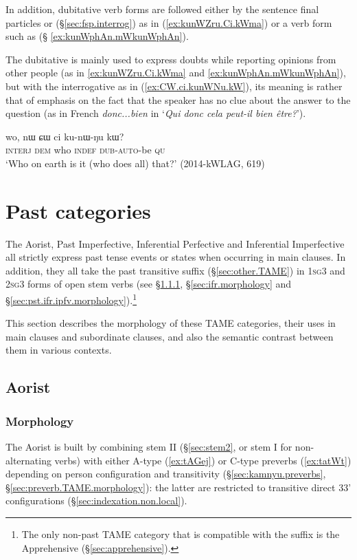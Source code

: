 In addition, dubitative verb forms are followed either by the sentence final particles  or  (§\ref{sec:fsp.interrog}) as in (\ref{ex:kunWZru.Ci.kWma}) or a verb form such as  (§ \ref{ex:kunWphAn.mWkunWphAn}).

The dubitative is mainly used to express doubts while reporting opinions from other people (as in \ref{ex:kunWZru.Ci.kWma} and \ref{ex:kunWphAn.mWkunWphAn}), but with the interrogative  as in (\ref{ex:CW.ci.kunWNu.kW}), its meaning is rather that of emphasis on the fact that the speaker has no clue about the answer to the question (as in French \textit{donc...bien} in `\textit{Qui donc cela peut-il bien être?}').

\begin{exe}
\ex \label{ex:CW.ci.kunWNu.kW}
 \gll wo, nɯ ɕɯ ci ku-nɯ-ŋu kɯ?  \\
 \textsc{interj} \textsc{dem} who \textsc{indef} \textsc{dub}-\textsc{auto}-be \textsc{qu} \\
\glt `Who on earth is it (who does all) that?' (2014-kWLAG, 619)
 \end{exe}
 
\section{Past categories}   \label{sec:TAME.pst}
The Aorist, Past Imperfective, Inferential Perfective and Inferential Imperfective all strictly express past tense events or states when occurring in main clauses. In addition, they all take the past transitive  suffix (§\ref{sec:other.TAME}) in \textsc{1sg}\fl{}3 and \textsc{2sg}\fl{}3 forms of open stem verbs (see §\ref{sec:aor.morphology}, §\ref{sec:ifr.morphology} and §\ref{sec:pst.ifr.ipfv.morphology}).\footnote{The only non-past TAME category that is compatible with the  suffix is the Apprehensive (§\ref{sec:apprehensive}). }

This section describes the morphology of these TAME categories, their uses in main clauses and subordinate clauses, and also the semantic contrast between them in various contexts.


\subsection{Aorist}    \label{sec:aor}

\subsubsection{Morphology} \label{sec:aor.morphology}
The Aorist is built by combining stem II (§\ref{sec:stem2}, or stem I for non-alternating verbs) with either A-type (\ref{ex:tAGej}) or C-type preverbs (\ref{ex:tatWt}) depending on person configuration and transitivity (§\ref{sec:kamnyu.preverbs}, §\ref{sec:preverb.TAME.morphology}): the latter are restricted to transitive direct 3\fl{}3' configurations (§\ref{sec:indexation.non.local}).

